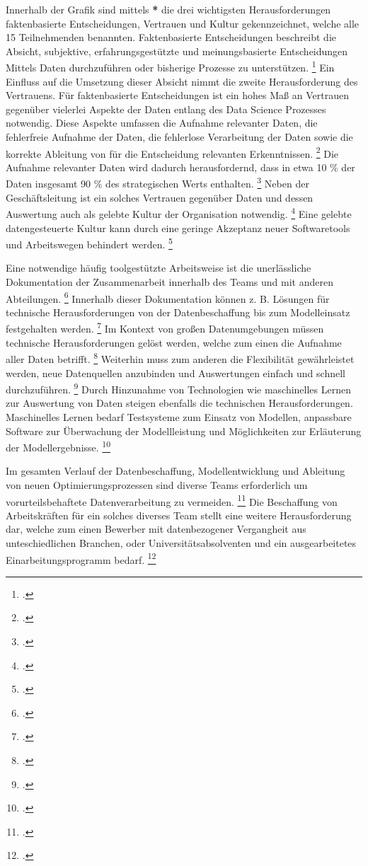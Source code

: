 Innerhalb der Grafik sind mittels \textbf{*} die drei wichtigsten Herausforderungen faktenbasierte Entscheidungen, Vertrauen und Kultur gekennzeichnet, welche alle 15 Teilnehmenden benannten.
Faktenbasierte Entscheidungen beschreibt die Absicht, subjektive, erfahrungsgestützte und meinungsbasierte Entscheidungen Mittels Daten durchzuführen oder bisherige Prozesse zu unterstützen. \footcite[Vgl.][S. 9]{Dalpiaz.2020}
Ein Einfluss auf die Umsetzung dieser Absicht nimmt die zweite Herausforderung des Vertrauens.
Für faktenbasierte Entscheidungen ist ein hohes Maß an Vertrauen gegenüber vielerlei Aspekte der Daten entlang des Data Science Prozesses notwendig.
Diese Aspekte umfassen die Aufnahme relevanter Daten, die fehlerfreie Aufnahme der Daten, die fehlerlose Verarbeitung der Daten sowie die korrekte Ableitung von für die Entscheidung relevanten Erkenntnissen. \footcite[Vgl.][S. 10]{Dalpiaz.2020}
Die Aufnahme relevanter Daten wird dadurch herausfordernd, dass in etwa 10 \% der Daten insgesamt 90 \% des strategischen Werts enthalten. \footcite[Vgl.][S. 3]{Pratt.2023}
Neben der Geschäftsleitung ist ein solches Vertrauen gegenüber Daten und dessen Auswertung auch als gelebte Kultur der Organisation notwendig. \footcite[Vgl.][S. 4]{Dalpiaz.2020}
Eine gelebte datengesteuerte Kultur kann durch eine geringe Akzeptanz neuer Softwaretools und Arbeitswegen behindert werden. \footcite[Vgl.][S. 15]{Dalpiaz.2020}

Eine notwendige häufig toolgestützte Arbeitsweise ist die unerlässliche Dokumentation der Zusammenarbeit innerhalb des Teams und mit anderen Abteilungen. \footcite[Vgl.][S. 12]{Zhang.2020b}
Innerhalb dieser Dokumentation können z. B. Lösungen für technische Herausforderungen von der Datenbeschaffung bis zum Modelleinsatz festgehalten werden. \footcite[Vgl.][S. 23]{Grossman.2014}
Im Kontext von großen Datenumgebungen müssen technische Herausforderungen gelöst werden, welche zum einen die Aufnahme aller Daten betrifft. \footcite[Vgl.][S. 217]{Elgendy.2014}
Weiterhin muss zum anderen die Flexibilität gewährleistet werden, neue Datenquellen anzubinden und Auswertungen einfach und schnell durchzuführen. \footcite[Vgl.][S. 217]{Elgendy.2014}
Durch Hinzunahme von Technologien wie maschinelles Lernen zur Auswertung von Daten steigen ebenfalls die technischen Herausforderungen.
Maschinelles Lernen bedarf Testsysteme zum Einsatz von Modellen, anpassbare Software zur Überwachung der Modellleistung und Möglichkeiten zur Erläuterung der Modellergebnisse. \footcite[Vgl.][S. 1]{Nahar.2022}

Im gesamten Verlauf der Datenbeschaffung, Modellentwicklung und Ableitung von neuen Optimierungsprozessen sind diverse Teams erforderlich um vorurteilsbehaftete Datenverarbeitung zu vermeiden. \footcite[Vgl.][S. 18]{Zhang.2020b}
Die Beschaffung von Arbeitskräften für ein solches diverses Team stellt eine weitere Herausforderung dar, welche zum einen Bewerber mit datenbezogener Vergangheit aus unteschiedlichen Branchen, oder Universitätsabsolventen und ein ausgearbeitetes Einarbeitungsprogramm bedarf. \footcite[Vgl.][S. 13]{Patil.2011}

